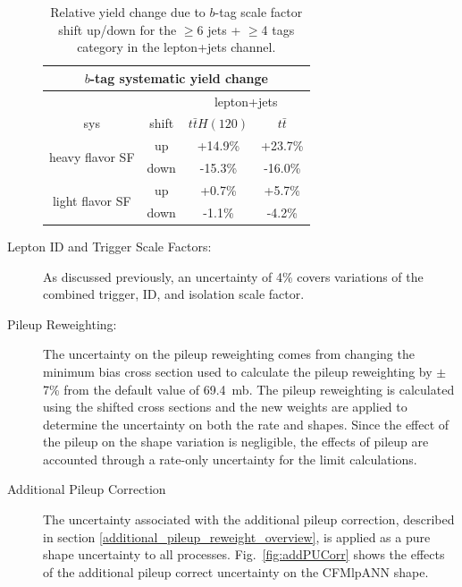 \begin{description}
 \begin{table}[hbtp] 
   \centering 
   \begin{tabular}{|c|c|c|c|} \hline 
     \multicolumn{4}{|c|}{$b$-tag systematic yield change} \\ \hline
     \multicolumn{2}{|c}{ } & \multicolumn{2}{|c|}{lepton+jets} \\ \hline
     sys & shift & $t\bar{t}H(120)$ & $t\bar{t}$  \\ \hline 
     \multirow{2}{*}{heavy flavor SF} & up     & +14.9\%  & +23.7\% \\
                            & down & -15.3\%  & -16.0\% \\ \hline
     \multirow{2}{*}{light flavor SF} & up     & +0.7\%  & +5.7\% \\
                            & down & -1.1\%  & -4.2\% \\ \hline
   \end{tabular} 
   \caption{Relative yield change due to $b$-tag scale factor shift up/down for the
     $\ge$6 jets + $\ge$4 tags category in the  lepton+jets channel.}
   \label{tab:btagSFShift}
 \end{table} 


  \item[Lepton ID and Trigger Scale Factors:] As discussed previously,
    an uncertainty of 4\% covers variations of the combined trigger,
    ID, and isolation scale factor.  

  \item[Pileup Reweighting:]  The uncertainty on the pileup
    reweighting comes from changing the minimum bias cross section
    used to calculate the pileup reweighting by $\pm$7\% from the
    default value of 69.4~mb.  The pileup reweighting is calculated
    using the shifted cross sections and the new weights are applied
    to determine the uncertainty on both the rate and shapes. Since
    the effect of the pileup on the shape variation is negligible, the
    effects of pileup are accounted through a rate-only uncertainty
    for the limit calculations. 

    \item[Additional Pileup Correction] The uncertainty associated
      with the additional pileup correction, described in section
      \ref{additional_pileup_reweight_overview}, is applied as a pure
      shape uncertainty to all processes.  Fig.~\ref{fig:addPUCorr} shows
      the effects of the additional pileup correct uncertainty on the
      CFMlpANN shape. 


\end{description}
